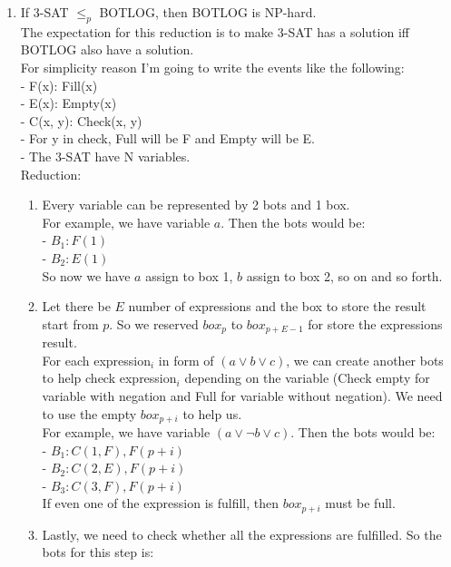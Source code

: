 \documentclass{article}
\begin{document}
	\begin{enumerate}
		\item {
			If 3-SAT $\leq_p$ BOTLOG, then BOTLOG is NP-hard.\\
			The expectation for this reduction is to make 3-SAT has a solution iff BOTLOG also have a solution.\\
			For simplicity reason I'm going to write the events like the following:\\
			- F(x): Fill(x)\\
			- E(x): Empty(x)\\
			- C(x, y): Check(x, y)\\
			- For y in check, Full will be F and Empty will be E.\\
			- The 3-SAT have N variables.
			\\Reduction:
			\begin{enumerate}
				\item {
					Every variable can be represented by 2 bots and 1 box.\\
					For example, we have variable $a$. Then the bots would be:\\
					- $B_1: F(1)$\\
					- $B_2: E(1)$\\
					So now we have $a$ assign to box 1, $b$ assign to box 2, so on and so forth.\\
				}
				\item {
					Let there be $E$ number of expressions and the box to store the result start from $p$. So we reserved $box_p$ to $box_{p + E - 1}$ for store the expressions result.\\
					For each expression$_i$ in form of $(a \vee b \vee c)$, we can create another bots to help check expression$_i$ depending on the variable (Check empty for variable with negation and Full for variable without negation). We need to use the empty $box_{p + i}$ to help us.\\
					For example, we have variable $(a \vee \neg b \vee c)$. Then the bots would be:\\
					- $B_1: C(1,F), F(p + i)$\\
					- $B_2: C(2,E), F(p + i)$\\
					- $B_3: C(3,F), F(p + i)$\\
					If even one of the expression is fulfill, then $box_{p + i}$ must be full.\\
				}
				\item {
					Lastly, we need to check whether all the expressions are fulfilled. So the bots for this step is:\\
}
\end{enumerate}}
\end{enumerate}
\end{document}
